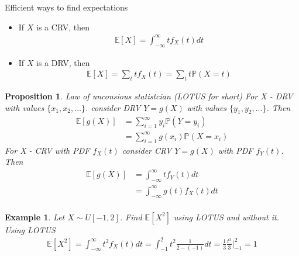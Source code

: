 \documentclass[10pt]{article}
\newtheorem*{proposition}{Proposition}
\newtheorem*{example}{Example}
\begin{document}
Efficient ways to find expectations
\begin{itemize}
\item If $X$ is a CRV, then
\begin{align}
\mathbb{E}[X]=\int_{-\infty}^\infty tf_X(t)dt
\end{align}
\item If $X$ is a DRV, then
\begin{align}
\mathbb{E}[X]=\sum_t tf_X(t)=\sum_t t\mathbb{P}(X=t)
\end{align}
\end{itemize}

\begin{proposition} Law of unconsious statistcian (LOTUS for short)
For X - DRV with values $\{x_1,x_2,\ldots\}$. consider DRV $Y=g(X)$ with values $\{y_1,y_2,\ldots\}$. Then
\begin{align}
\mathbb{E}[g(X)]
&=\sum_{i=1}^\infty y_i\mathbb{P}(Y=y_i)\\
&=\sum_{i=1}^\infty g(x_i)\mathbb{P}(X=x_i)
\end{align}
For X - CRV with PDF $f_X(t)$ consider CRV $Y=g(X)$ with PDF $f_Y(t)$. Then
\begin{align}
\mathbb{E}[g(X)]
&=\int_{-\infty}^{\infty} tf_Y(t)dt\\
&=\int_{-\infty}^{\infty} g(t)f_X(t)dt\\
\end{align}
\end{proposition}

\begin{example} Let $X\sim U[-1,2]$. Find $\mathbb{E}[X^2]$ using LOTUS and without it. 
Using LOTUS
\begin{align}
\mathbb{E}[X^2]=\int_{-\infty}^\infty t^2 f_X(t)dt=\int_{-1}^{2} t^2 \frac{1}{2-(-1)}dt=\frac{1}{3}\frac{t^3}{3}\Biggl|_{-1}^2=1
\end{align}
\end{example}
\end{document}
